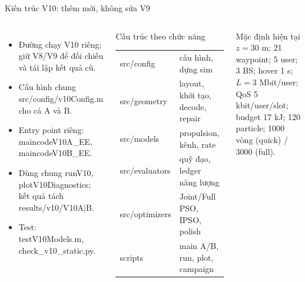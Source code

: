 \documentclass[t,aspectratio=169]{beamer}
\newcommand{\code}[1]{{\small\ttfamily #1}}
\begin{document}
\begin{frame}{Kiến trúc V10: thêm mới, không sửa V9}
  \begin{columns}[T]
  \footnotesize
  \begin{itemize}\setlength{\itemsep}{2pt}
    \item Đường chạy V10 riêng; giữ V8/V9 để đối chiếu và tái lập kết quả cũ.
    \item Cấu hình chung \code{src/config/v10Config.m} cho cả A và B.
    \item Entry point riêng: \code{maincodeV10A\_EE}, \code{maincodeV10B\_EE}.
    \item Dùng chung \code{runV10}, \code{plotV10Diagnostics}; kết quả tách \code{results/v10/V10A|B}.
    \item Test: \code{testV10Models.m}, \code{check\_v10\_static.py}.
  \end{itemize}
  \begin{block}{Cấu trúc theo chức năng}\scriptsize
  \begin{tabular}{@{}ll@{}}
    \toprule
    \code{src/config} & cấu hình, dựng \code{sim}\\
    \code{src/geometry} & layout, khởi tạo, decode, repair\\
    \code{src/models} & propulsion, kênh, rate\\
    \code{src/evaluators} & quỹ đạo, ledger năng lượng\\
    \code{src/optimizers} & Joint/Full PSO, IPSO, polish\\
    \code{scripts} & main A/B, run, plot, campaign\\
    \bottomrule
  \end{tabular}
  \end{block}
  \begin{block}{Mặc định hiện tại}\scriptsize
  $z=30$ m; 21 waypoint; 5 user; 3 BS; hover 1 s; $L=3$ Mbit/user; QoS 5 kbit/user/slot; budget 17 kJ; 120 particle; 1000 vòng (quick) / 3000 (full).
  \end{block}
  \end{columns}
\end{frame}
\end{document}
